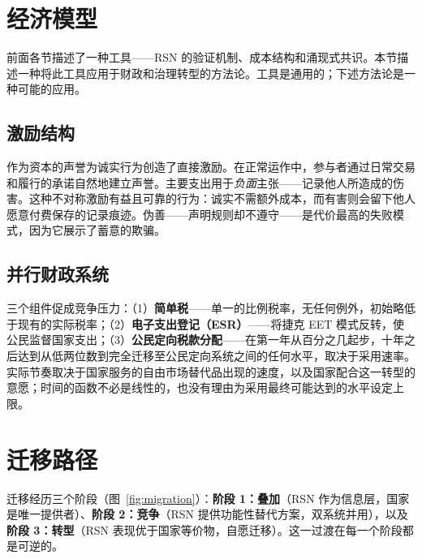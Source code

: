 \documentclass[11pt,a4paper,twocolumn]{article}
\begin{document}
\section{经济模型}

前面各节描述了一种工具——RSN 的验证机制、成本结构和涌现式共识。本节描述一种将此工具应用于财政和治理转型的方法论。工具是通用的；下述方法论是一种可能的应用。

\subsection{激励结构}

作为资本的声誉为诚实行为创造了直接激励。在正常运作中，参与者通过日常交易和履行的承诺自然地建立声誉。主要支出用于\emph{负面}主张——记录他人所造成的伤害。这种不对称激励有益且可靠的行为：诚实不需额外成本，而有害则会留下他人愿意付费保存的记录痕迹。伪善——声明规则却不遵守——是代价最高的失败模式，因为它展示了蓄意的欺骗。

\subsection{并行财政系统}

三个组件促成竞争压力：（1）\textbf{简单税}——单一的比例税率，无任何例外，初始略低于现有的实际税率；（2）\textbf{电子支出登记（ESR）}——将捷克 EET 模式反转，使公民监督国家支出；（3）\textbf{公民定向税款分配}——在第一年从百分之几起步，十年之后达到从低两位数到完全迁移至公民定向系统之间的任何水平，取决于采用速率。实际节奏取决于国家服务的自由市场替代品出现的速度，以及国家配合这一转型的意愿；时间的函数不必是线性的，也没有理由为采用最终可能达到的水平设定上限。

\section{迁移路径}

迁移经历三个阶段（图~\ref{fig:migration}）：\textbf{阶段 1：叠加}（RSN 作为信息层，国家是唯一提供者）、\textbf{阶段 2：竞争}（RSN 提供功能性替代方案，双系统并用），以及\textbf{阶段 3：转型}（RSN 表现优于国家等价物，自愿迁移）。这一过渡在每一个阶段都是可逆的。
\end{document}
